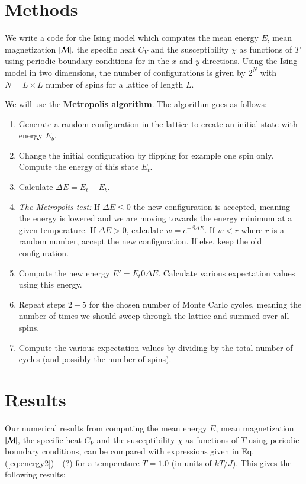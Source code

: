 \documentclass{article}
\begin{document}
\begin{multicols}{2}
\section{Methods}

We write a code for the Ising model which computes the mean energy $E$, mean magnetization $|{\cal M}|$, the specific heat $C_V$ and the susceptibility $\chi$ as functions of  $T$ using periodic boundary conditions for in the $x$ and $y$ directions. Using the Ising model in two dimensions, the number of configurations is given by $2^N$ with $N = L \times L$ number of spins for a lattice of length $L$. 

We will use the \textbf{Metropolis algorithm}. The algorithm goes as follows:

\begin{enumerate}
	\item Generate a random configuration in the lattice to create an initial state with energy $E_b$.
	\item Change the initial configuration by flipping for example one spin only. Compute the energy of this state $E_t$.
	\item Calculate $\Delta E = E_t - E_b$.
	\item \textit{The Metropolis test:} If $\Delta E \leq 0$ the new configuration is accepted, meaning the energy is lowered and we are moving towards the energy minimum at a given temperature. If $\Delta E > 0$, calculate $w = e^{- \beta \Delta E}$. If $w < r$ where $r$ is a random number, accept the new configuration. If else, keep the old configuration.
	\item Compute the new energy $E' = E_t 0 \Delta E$. Calculate various expectation values using this energy.
	\item Repeat steps $2-5$ for the chosen number of Monte Carlo cycles, meaning the number of times we should sweep through the lattice and summed over all spins.
	\item Compute the various expectation values by dividing by the total number of cycles (and possibly the number of spins).
\end{enumerate}





\section{Results}

Our numerical results from computing the mean energy $E$, mean magnetization $|{\cal M}|$, the specific heat $C_V$ and the susceptibility $\chi$ as functions of $T$ using periodic boundary conditions, can be compared with expressions given in Eq. (\ref{eq:energy2}) - (?) for a temperature $T=1.0$ (in units of $kT/J$). This gives the following results:


\end{multicols}
\end{document}

